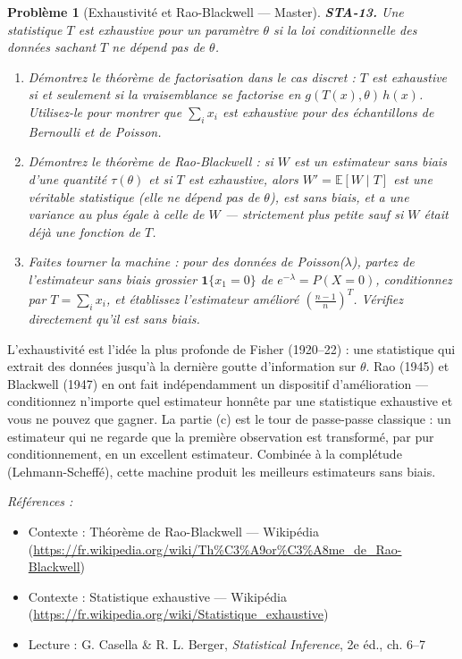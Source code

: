 \documentclass[11pt]{article}
\newtheorem{problem}{Problème}
\newenvironment{refs}{\par\small\noindent\emph{Références :}\begin{itemize}\setlength\itemsep{0pt}}{\end{itemize}\normalsize}
\begin{document}
\bigskip

\begin{problem}[{Exhaustivité et Rao-Blackwell --- Master}]
\textbf{STA-13.} Une statistique $ T $ est exhaustive pour un paramètre $ \theta $ si la loi
conditionnelle des données sachant $ T $ ne dépend pas de $ \theta $.
\begin{enumerate}
\item[(a)] Démontrez le théorème de factorisation dans le cas discret : $ T $ est exhaustive si et
seulement si la vraisemblance se factorise en $ g(T(x), \theta)\, h(x) $. Utilisez-le pour
montrer que $ \sum_i x_i $ est exhaustive pour des échantillons de Bernoulli et de Poisson.
\item[(b)] Démontrez le théorème de Rao-Blackwell : si $ W $ est un estimateur sans biais d'une quantité
$ \tau(\theta) $ et si $ T $ est exhaustive, alors $ W' = \mathbb{E}[W \mid T] $ est une
véritable statistique (elle ne dépend pas de $ \theta $), est sans biais, et a une variance au
plus égale à celle de $ W $ --- strictement plus petite sauf si $ W $ était déjà une fonction de
$ T $.
\item[(c)] Faites tourner la machine : pour des données de Poisson($ \lambda $), partez de l'estimateur
sans biais grossier $ \mathbf{1}\{x_1 = 0\} $ de $ e^{-\lambda} = P(X = 0) $, conditionnez par
$ T = \sum_i x_i $, et établissez l'estimateur amélioré
$ \left(\frac{n-1}{n}\right)^{T} $. Vérifiez directement qu'il est sans biais.
\end{enumerate}

\end{problem}

\noindent L'exhaustivité est l'idée la plus profonde de Fisher (1920--22) : une statistique
qui extrait des données jusqu'à la dernière goutte d'information sur $\theta$. Rao (1945) et Blackwell
(1947) en ont fait indépendamment un dispositif d'amélioration --- conditionnez n'importe quel
estimateur honnête par une statistique exhaustive et vous ne pouvez que gagner. La partie (c) est
le tour de passe-passe classique : un estimateur qui ne regarde que la première observation est
transformé, par pur conditionnement, en un excellent estimateur. Combinée à la complétude
(Lehmann-Scheffé), cette machine produit les meilleurs estimateurs sans biais.

\begin{refs}
\item Contexte : Théorème de Rao-Blackwell --- Wikipédia (\url{https://fr.wikipedia.org/wiki/Th%C3%A9or%C3%A8me_de_Rao-Blackwell})
\item Contexte : Statistique exhaustive --- Wikipédia (\url{https://fr.wikipedia.org/wiki/Statistique_exhaustive})
\item Lecture : G. Casella \& R. L. Berger, \textit{Statistical Inference}, 2e éd., ch. 6--7
\end{refs}
\end{document}
